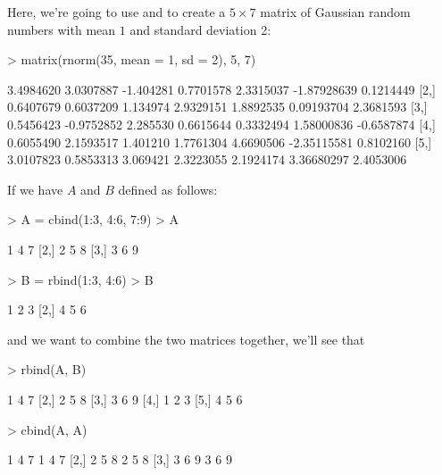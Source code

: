 \documentclass[11pt, oneside, reqno]{article}
\begin{document}
\eans

Here, we're going to use \verb@rnorm@ and \verb@matrix@ to create a $5\times 7$ matrix of Gaussian random numbers with mean $1$ and standard deviation 2:

\begin{Schunk}
\begin{Sinput}
> matrix(rnorm(35, mean = 1, sd = 2), 5, 7)
\end{Sinput}
\begin{Soutput}
          [,1]       [,2]      [,3]      [,4]      [,5]        [,6]       [,7]
[1,] 3.4984620  3.0307887 -1.404281 0.7701578 2.3315037 -1.87928639  0.1214449
[2,] 0.6407679  0.6037209  1.134974 2.9329151 1.8892535  0.09193704  2.3681593
[3,] 0.5456423 -0.9752852  2.285530 0.6615644 0.3332494  1.58000836 -0.6587874
[4,] 0.6055490  2.1593517  1.401210 1.7761304 4.6690506 -2.35115581  0.8102160
[5,] 3.0107823  0.5853313  3.069421 2.3223055 2.1924174  3.36680297  2.4053006
\end{Soutput}
\end{Schunk}

\eans


If we have $A$ and $B$ defined as follows:

\begin{Schunk}
\begin{Sinput}
> A = cbind(1:3, 4:6, 7:9)
> A
\end{Sinput}
\begin{Soutput}
     [,1] [,2] [,3]
[1,]    1    4    7
[2,]    2    5    8
[3,]    3    6    9
\end{Soutput}
\begin{Sinput}
> B = rbind(1:3, 4:6)
> B
\end{Sinput}
\begin{Soutput}
     [,1] [,2] [,3]
[1,]    1    2    3
[2,]    4    5    6
\end{Soutput}
\end{Schunk}

and we want to combine the two matrices together, we'll see that

\begin{Schunk}
\begin{Sinput}
> rbind(A, B)
\end{Sinput}
\begin{Soutput}
     [,1] [,2] [,3]
[1,]    1    4    7
[2,]    2    5    8
[3,]    3    6    9
[4,]    1    2    3
[5,]    4    5    6
\end{Soutput}
\begin{Sinput}
> cbind(A, A)
\end{Sinput}
\begin{Soutput}
     [,1] [,2] [,3] [,4] [,5] [,6]
[1,]    1    4    7    1    4    7
[2,]    2    5    8    2    5    8
[3,]    3    6    9    3    6    9
\end{Soutput}
\end{Schunk}
\end{document}

